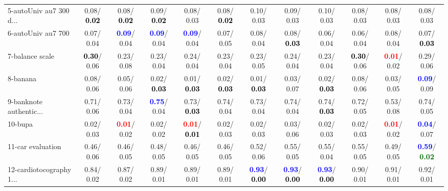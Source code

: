 \begin{table}[h]
\begin{center}
{\begin{tabular}{lc|c|c|c|c|c|c|c|c|c|c}
5-autoUniv au7 300 d... &   0.08/\textcolor{black}{\textbf{  0.02}} &   0.08/\textcolor{black}{\textbf{  0.02}} &   0.09/\textcolor{black}{\textbf{  0.02}} &   0.08/  0.03 &   0.08/\textcolor{black}{\textbf{  0.02}} &   0.10/  0.03 &   0.09/  0.03 &   0.10/  0.03 &   0.08/  0.03 &   0.08/  0.03 &   0.08/  0.03 \\
6-autoUniv au7 700 &   0.07/  0.04 & \textcolor{blue}{\textbf{  0.09}}/  0.04 & \textcolor{blue}{\textbf{  0.09}}/  0.04 & \textcolor{blue}{\textbf{  0.09}}/  0.04 &   0.07/  0.05 &   0.08/  0.04 &   0.08/\textcolor{black}{\textbf{  0.03}} &   0.06/  0.04 &   0.06/  0.04 &   0.08/  0.04 &   0.07/\textcolor{black}{\textbf{  0.03}} \\
7-balance scale & \textcolor{black}{\textbf{  0.30}}/  0.06 &   0.23/  0.08 &   0.23/  0.04 &   0.24/  0.04 &   0.23/  0.04 &   0.23/  0.05 &   0.24/  0.04 &   0.23/  0.04 & \textcolor{black}{\textbf{  0.30}}/  0.06 & \textcolor{red}{\textbf{  0.01}}/  0.02 &   0.29/  0.06 \\ \hline
8-banana &   0.08/  0.06 &   0.05/  0.06 &   0.02/\textcolor{black}{\textbf{  0.03}} &   0.01/\textcolor{black}{\textbf{  0.03}} &   0.02/\textcolor{black}{\textbf{  0.03}} &   0.01/\textcolor{black}{\textbf{  0.03}} &   0.03/  0.07 &   0.02/\textcolor{black}{\textbf{  0.03}} &   0.08/  0.06 &   0.03/  0.05 & \textcolor{blue}{\textbf{  0.09}}/  0.09 \\
9-banknote authentic... &   0.71/  0.06 &   0.73/  0.04 & \textcolor{blue}{\textbf{  0.75}}/  0.04 &   0.73/\textcolor{black}{\textbf{  0.03}} &   0.74/  0.04 &   0.73/  0.04 &   0.74/  0.04 &   0.74/\textcolor{black}{\textbf{  0.03}} &   0.72/  0.05 &   0.53/  0.08 &   0.74/  0.05 \\
10-bupa &   0.02/  0.03 & \textcolor{red}{\textbf{  0.01}}/  0.02 &   0.02/  0.02 & \textcolor{red}{\textbf{  0.01}}/\textcolor{black}{\textbf{  0.01}} &   0.02/  0.03 &   0.02/  0.03 &   0.03/  0.06 &   0.02/  0.03 &   0.02/  0.03 & \textcolor{red}{\textbf{  0.01}}/  0.02 & \textcolor{blue}{\textbf{  0.04}}/  0.07 \\
11-car evaluation &   0.46/  0.06 &   0.46/  0.05 &   0.48/  0.05 &   0.46/  0.05 &   0.46/  0.05 &   0.52/  0.06 &   0.55/  0.05 &   0.55/  0.04 &   0.55/  0.05 &   0.49/  0.05 & \textcolor{blue}{\textbf{  0.59}}/\textcolor{darkgreen}{\textbf{  0.02}} \\
12-cardiotocography 1... &   0.84/  0.02 &   0.87/  0.02 &   0.89/  0.01 &   0.89/  0.01 &   0.89/  0.01 & \textcolor{blue}{\textbf{  0.93}}/\textcolor{black}{\textbf{  0.00}} & \textcolor{blue}{\textbf{  0.93}}/\textcolor{black}{\textbf{  0.00}} & \textcolor{blue}{\textbf{  0.93}}/\textcolor{black}{\textbf{  0.00}} &   0.90/  0.01 &   0.91/  0.01 &   0.92/  0.01 \\

\end{tabular}}
\end{center}
\end{table}

